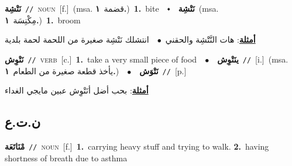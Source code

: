 \documentclass[10pt,a4paper,twoside]{article} %
\begin{document}
\begin{multicols}{2}
{{{{{{{{{{{\setlength\topsep{0pt}\textbf{\foreignlanguage{arabic}{نَتْشِة}}\ {\color{gray}\texttt{//}\color{black}}\ \textsc{noun}\ [f.]\ \color{gray}(msa. \foreignlanguage{arabic}{قضمة}~\foreignlanguage{arabic}{\textbf{١.}})\color{black}\ \textbf{1.}~bite\ \ $\smblkdiamond$\ \ \setlength\topsep{0pt}\textbf{\foreignlanguage{arabic}{نَتْشِة}}\ \color{gray}(msa. \foreignlanguage{arabic}{مِكْنِسَة}~\foreignlanguage{arabic}{\textbf{١.}})\color{black}\ \textbf{1.}~broom\  \begin{flushright}\color{gray}\foreignlanguage{arabic}{\textbf{\underline{\foreignlanguage{arabic}{أمثلة}}}: هات النَّتْشِة والحقني\ $\bullet$\ \  انتشلك نَتْشِة صغيرة من اللحمة لحمة بلدية}\end{flushright}\color{black}} \vspace{2mm}

{\setlength\topsep{0pt}\textbf{\foreignlanguage{arabic}{نَتْوِش}}\ {\color{gray}\texttt{//}\color{black}}\ \textsc{verb}\ [c.]\ \textbf{1.}~take a very small piece of food\ \ $\bullet$\ \ \setlength\topsep{0pt}\textbf{\foreignlanguage{arabic}{ينَتْوِش}}\ {\color{gray}\texttt{//}\color{black}}\ [i.]\ \color{gray}(msa. \foreignlanguage{arabic}{يأخذ قطعة صغيرة من الطعام}~\foreignlanguage{arabic}{\textbf{١.}})\color{black}\ \ $\bullet$\ \ \setlength\topsep{0pt}\textbf{\foreignlanguage{arabic}{نَتْوَش}}\ {\color{gray}\texttt{//}\color{black}}\ [p.]\  \begin{flushright}\color{gray}\foreignlanguage{arabic}{\textbf{\underline{\foreignlanguage{arabic}{أمثلة}}}: بحب أضل أنَتْوِش عبين مايجي الغداء}\end{flushright}\color{black}} \vspace{2mm}

\vspace{-3mm}
\subsection*{\color{blue}\foreignlanguage{arabic}{ن.ت.ع}\color{blue}{}} 

{\setlength\topsep{0pt}\textbf{\foreignlanguage{arabic}{مْنَاتَعَة}}\ {\color{gray}\texttt{//}\color{black}}\ \textsc{noun}\ [f.]\ \textbf{1.}~carrying heavy stuff and trying to walk.  \textbf{2.}~having shortness of breath due to asthma\ 

}}}}}}}}}}}
\end{multicols}
\end{document}

